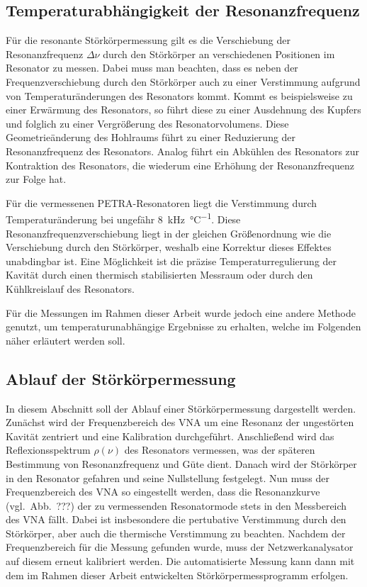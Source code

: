 \subsection{Temperaturabhängigkeit der Resonanzfrequenz}
\label{sec:temperaturabh_resonanzfrequenz}
Für die resonante Störkörpermessung gilt es die Verschiebung der Resonanzfrequenz $\Delta \nu$ durch den Störkörper an verschiedenen Positionen im Resonator zu messen.
Dabei muss man beachten, dass es neben der Frequenzverschiebung durch den Störkörper auch zu einer Verstimmung aufgrund von Temperaturänderungen des Resonators kommt.
Kommt es beispielsweise zu einer Erwärmung des Resonators, so führt diese zu einer Ausdehnung des Kupfers und folglich zu einer Vergrößerung des Resonatorvolumens.
Diese Geometrieänderung des Hohlraums führt zu einer Reduzierung der Resonanzfrequenz des Resonators.
Analog führt ein Abkühlen des Resonators zur Kontraktion des Resonators, die wiederum eine Erhöhung der Resonanzfrequenz zur Folge hat.

Für die vermessenen PETRA-Resonatoren liegt die Verstimmung durch Temperaturänderung bei ungefähr \SI{8}{\kilo\hertz\per\celsius}.
Diese Resonanzfrequenzverschiebung liegt in der gleichen Größenordnung wie die Verschiebung durch den Störkörper, weshalb eine Korrektur dieses Effektes unabdingbar ist.
Eine Möglichkeit ist die präzise Temperaturregulierung der Kavität durch einen thermisch stabilisierten Messraum oder durch den Kühlkreislauf des Resonators.

Für die Messungen im Rahmen dieser Arbeit wurde jedoch eine andere Methode genutzt, um temperaturunabhängige Ergebnisse zu erhalten, welche im Folgenden näher erläutert werden soll.


\subsection{Ablauf der Störkörpermessung}
In diesem Abschnitt soll der Ablauf einer Störkörpermessung dargestellt werden.
Zunächst wird der Frequenzbereich des VNA um eine Resonanz der ungestörten Kavität zentriert und eine Kalibration durchgeführt.
Anschließend wird das Reflexionsspektrum $\rho(\nu)$ des Resonators vermessen, was der späteren Bestimmung von Resonanzfrequenz und Güte dient.
Danach wird der Störkörper in den Resonator gefahren und seine Nullstellung festgelegt.
Nun muss der Frequenzbereich des VNA so eingestellt werden, dass die Resonanzkurve (vgl.\ Abb.\ ???) der zu vermessenden Resonatormode stets in den Messbereich des VNA fällt.
Dabei ist insbesondere die pertubative Verstimmung durch den Störkörper, aber auch die thermische Verstimmung zu beachten.
Nachdem der Frequenzbereich für die Messung gefunden wurde, muss der Netzwerkanalysator auf diesem erneut kalibriert werden.
Die automatisierte Messung kann dann mit dem im Rahmen dieser Arbeit entwickelten Störkörpermessprogramm erfolgen.

